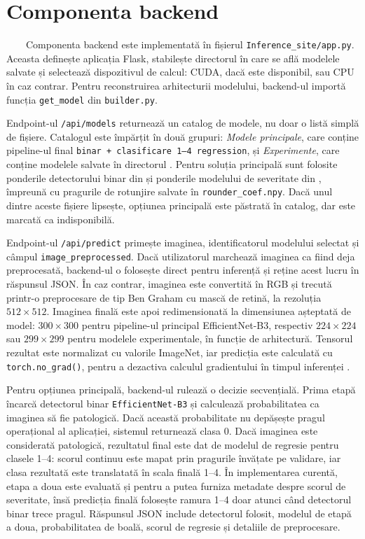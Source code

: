 \documentclass[12pt, a4paper, twoside, romanian]{teza-upb}
\begin{document}
\section{Componenta backend}

\ \ \ \ Componenta backend este implementată în fișierul \texttt{Inference\_site/app.py}. Aceasta definește aplicația Flask, stabilește
directorul în care se află modelele salvate și selectează dispozitivul de calcul:
CUDA, dacă este disponibil, sau CPU în caz contrar. Pentru reconstruirea arhitecturii
modelului, backend-ul importă funcția \texttt{get\_model} din \texttt{builder.py}.
\bigskip

Endpoint-ul \texttt{/api/models} returnează un catalog de modele, nu doar o listă simplă de fișiere.
Catalogul este împărțit în două grupuri: \textit{Modele principale}, care conține pipeline-ul final
\texttt{binar + clasificare 1--4 regression}, și \textit{Experimente}, care conține modelele salvate în
directorul . Pentru soluția principală sunt folosite ponderile
detectorului binar din
 și ponderile modelului
de severitate din ,
împreună cu pragurile de rotunjire salvate în \texttt{rounder\_coef.npy}. Dacă unul dintre aceste fișiere
lipsește, opțiunea principală este păstrată în catalog, dar este marcată ca indisponibilă.
\bigskip

Endpoint-ul \texttt{/api/predict} primește imaginea, identificatorul modelului selectat și câmpul
\texttt{image\_preprocessed}. Dacă utilizatorul marchează imaginea ca fiind deja preprocesată, backend-ul
o folosește direct pentru inferență și reține acest lucru în răspunsul JSON. În caz contrar, imaginea
este convertită în RGB și trecută printr-o preprocesare de tip Ben Graham cu mască de retină, la
rezoluția \(512 \times 512\). Imaginea finală este apoi redimensionată la dimensiunea așteptată de
model: \(300 \times 300\) pentru pipeline-ul principal EfficientNet-B3, respectiv \(224 \times 224\) sau
\(299 \times 299\) pentru modelele experimentale, în funcție de arhitectură. Tensorul rezultat este
normalizat cu valorile ImageNet, iar predicția este calculată cu \texttt{torch.no\_grad()}, pentru a
dezactiva calculul gradientului în timpul inferenței \cite{pytorch_docs}.
\bigskip

Pentru opțiunea principală, backend-ul rulează o decizie secvențială. Prima etapă încarcă detectorul
binar \texttt{EfficientNet-B3} și calculează probabilitatea ca imaginea să fie patologică. Dacă această
probabilitate nu depășește pragul operațional al aplicației, sistemul returnează clasa 0. Dacă imaginea
este considerată patologică, rezultatul final este dat de modelul de regresie pentru clasele 1--4:
scorul continuu este mapat prin pragurile învățate pe validare, iar clasa rezultată este translatată în
scala finală 1--4. În implementarea curentă, etapa a doua este evaluată și pentru a putea furniza
metadate despre scorul de severitate, însă predicția finală folosește ramura 1--4 doar atunci când
detectorul binar trece pragul. Răspunsul JSON include detectorul folosit, modelul de etapă a doua,
probabilitatea de boală, scorul de regresie și detaliile de preprocesare.
\end{document}
